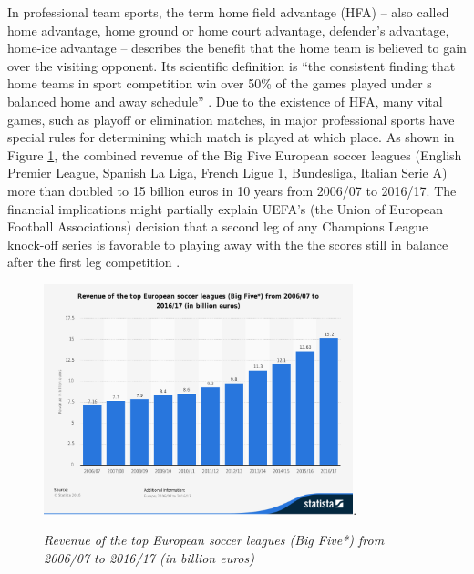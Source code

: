 \documentclass[USenglish]{article}
\begin{document}
In professional team sports, the term home field advantage (HFA) – also called home advantage, home ground or home court advantage, defender's advantage, home-ice advantage – describes the benefit that the home team is believed to gain over the visiting opponent. Its scientific definition is ``the consistent finding that home teams in sport competition win over 50\% of the games played under s balanced home and away schedule'' \citep[p. 13]{Courneya1992}.
Due to the existence of HFA, many vital games, such as playoff or elimination matches, in major professional sports have special rules for determining which match is played at which place.  As shown in Figure \ref{fig11}, the combined revenue of the Big Five European soccer leagues (English Premier League, Spanish La Liga, French Ligue 1, Bundesliga, Italian Serie A) more than doubled to 15 billion euros in 10 years from 2006/07 to 2016/17. The financial implications might partially explain UEFA's (the Union of European Football Associations) decision that a second leg of any Champions League knock-off series is favorable to playing away with the the scores still in balance after the first leg competition \citep{atkins2013}.

\begin{figure}[ht]
\caption{\textit{Revenue of the top European soccer leagues (Big Five*) from 2006/07 to 2016/17 (in billion euros)}}
\centering\includegraphics[width=0.8\textwidth]{HFA11.pdf}. 
\label{fig11}
\end{figure}
\end{document}
